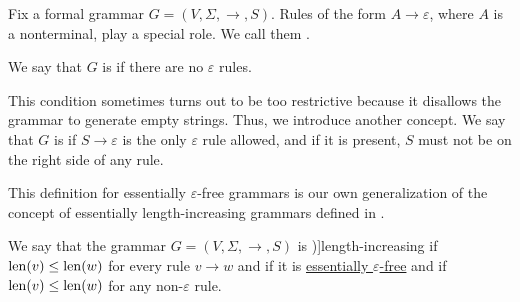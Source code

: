 \begin{definition}\label{def:epsilon_free_grammar}
  Fix a formal grammar \( G = (V, \Sigma, \to, S) \). Rules of the form \( A \to \varepsilon \), where \( A \) is a nonterminal, play a special role. We call them .

  We say that \( G \) is  if there are no \( \varepsilon \) rules.

  This condition sometimes turns out to be too restrictive because it disallows the grammar to generate empty strings. Thus, we introduce another concept. We say that \( G \) is  if \( S \to \varepsilon \) is the only \( \varepsilon \) rule allowed, and if it is present, \( S \) must not be on the right side of any rule.
\end{definition}
\begin{comments}
  \item This definition for essentially \( \varepsilon \)-free grammars is our own generalization of the concept of essentially length-increasing grammars defined in .
\end{comments}

\begin{definition}\label{def:length_increasing_grammar}
  We say that the grammar \( G = (V, \Sigma, \to, S) \) is \term[ru=неукорачивающая (граматика) (\cite[83]{Гладкий1973Языки})]{length-increasing} if \( \operatorname{len}(v) \leq \operatorname{len}(w) \) for every rule \( v \to w \) and  if it is \hyperref[def:epsilon_free_grammar]{essentially \( \varepsilon \)-free} and if \( \operatorname{len}(v) \leq \operatorname{len}(w) \) for any non-\( \varepsilon \) rule.
\end{definition}

